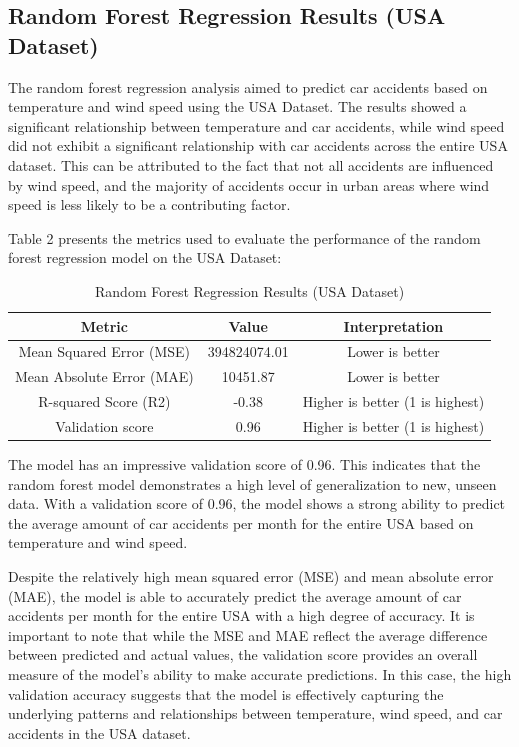 \documentclass{article}
\begin{document}

\subsection{Random Forest Regression Results (USA Dataset)}

The random forest regression analysis aimed to predict car accidents based on temperature and wind speed using the USA Dataset. The results showed a significant relationship between temperature and car accidents, while wind speed did not exhibit a significant relationship with car accidents across the entire USA dataset. This can be attributed to the fact that not all accidents are influenced by wind speed, and the majority of accidents occur in urban areas where wind speed is less likely to be a contributing factor.

Table 2 presents the metrics used to evaluate the performance of the random forest regression model on the USA Dataset:

\begin{table}[htbp]
    \centering
    \caption{Random Forest Regression Results (USA Dataset)}
    \begin{tabular}{ccc}
        \hline
        Metric                    & Value        & Interpretation                  \\
        \hline
        Mean Squared Error (MSE)  & 394824074.01 & Lower is better                 \\
        Mean Absolute Error (MAE) & 10451.87     & Lower is better                 \\
        R-squared Score (R2)      & -0.38        & Higher is better (1 is highest) \\
        Validation score          & 0.96         & Higher is better (1 is highest) \\
        \hline
    \end{tabular}
\end{table}

The model has an impressive validation score of 0.96. This indicates that the random forest model demonstrates a high level of generalization to new, unseen data. With a validation score of 0.96, the model shows a strong ability to predict the average amount of car accidents per month for the entire USA based on temperature and wind speed.

Despite the relatively high mean squared error (MSE) and mean absolute error (MAE), the model is able to accurately predict the average amount of car accidents per month for the entire USA with a high degree of accuracy. It is important to note that while the MSE and MAE reflect the average difference between predicted and actual values, the validation score provides an overall measure of the model's ability to make accurate predictions. In this case, the high validation accuracy suggests that the model is effectively capturing the underlying patterns and relationships between temperature, wind speed, and car accidents in the USA dataset.
\end{document}
